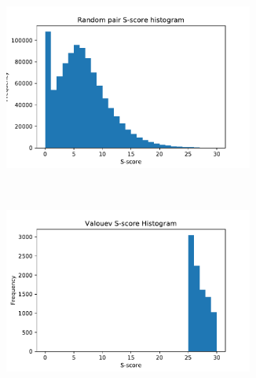 \begin{figure}[h!t]
\begin{subfigure}[b]{0.5\textwidth}
\includegraphics[width=0.9\textwidth]{gcsa_paper/content/figures/shist_random.pdf}
\end{subfigure}~\begin{subfigure}[b]{0.5\textwidth}
\includegraphics[width=0.9\textwidth]{gcsa_paper/content/figures/shist_valouev.pdf}
\end{subfigure}


\end{figure}
